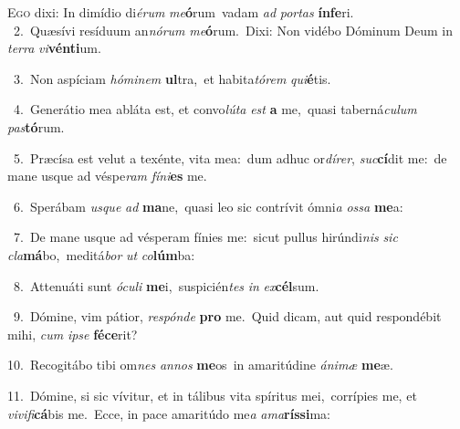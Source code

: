 \lettrine{\initial\textcolor{\initialcolor}{E}}{go} dixi: In dimídio di\-\textit{é}\-\textit{rum} \textit{me}\-\textbf{ó}rum~\star vadam \textit{ad} \textit{por}\-\textit{tas} \textbf{ín}\-\textbf{fe}ri.\\
{\numbfont\textcolor{\numbcolor}{~2.}}~Quæsívi resíduum an\-\textit{nó}\-\textit{rum} \textit{me}\-\textbf{ó}rum.~\star Dixi: Non vidébo Dóminum Deum in \textit{ter}\-\textit{ra} \textit{vi}\-\textbf{vén}\textbf{ti}um.\par
{\numbfont\textcolor{\numbcolor}{~3.}}~Non aspíciam \textit{hó}\-\textit{mi}\textit{nem} \textbf{ul}\-tra,~\star et habita\-\textit{tó}\-\textit{rem} \textit{qui}\-\textbf{é}tis.\par
{\numbfont\textcolor{\numbcolor}{~4.}}~Generátio mea abláta est, et convo\-\textit{lú}\-\textit{ta} \textit{est} \textbf{a} me,~\star quasi taberná\-\textit{cu}\-\textit{lum} \textit{pas}\-\textbf{tó}rum.\par
{\numbfont\textcolor{\numbcolor}{~5.}}~Præcísa est velut a texénte, vita mea:~\dagger dum adhuc or\-\textit{dí}\-\textit{rer}, \textit{suc}\-\textbf{cí}dit me:~\star de mane usque ad véspe\textit{ram} \textit{fí}\-\textit{ni}\textbf{es} me.\par
{\numbfont\textcolor{\numbcolor}{~6.}}~Sperábam \textit{us}\-\textit{que} \textit{ad} \textbf{ma}\-ne,~\star quasi leo sic contrívit ómni\textit{a} \textit{os}\-\textit{sa} \textbf{me}\-a:\par
{\numbfont\textcolor{\numbcolor}{~7.}}~De mane usque ad vésperam fínies me:~\dagger sicut pullus hirúndi\textit{nis} \textit{sic} \textit{cla}\-\textbf{má}bo,~\star meditá\textit{bor} \textit{ut} \textit{co}\-\textbf{lúm}ba:\par
{\numbfont\textcolor{\numbcolor}{~8.}}~Attenuáti sunt \textit{ó}\-\textit{cu}\textit{li} \textbf{me}\-i,~\star suspicién\textit{tes} \textit{in} \textit{ex}\-\textbf{cél}sum.\par
{\numbfont\textcolor{\numbcolor}{~9.}}~Dómine, vim pátior, \textit{re}\-\textit{spón}\textit{de} \textbf{pro} me.~\star Quid dicam, aut quid respondébit mihi, \textit{cum} \textit{ip}\-\textit{se} \textbf{fé}\-\textbf{ce}rit?\par
{\numbfont\textcolor{\numbcolor}{10.}}~Recogitábo tibi om\textit{nes} \textit{an}\-\textit{nos} \textbf{me}\-os~\star in amaritúdine \textit{á}\-\textit{ni}\textit{mæ} \textbf{me}\-æ.\par
{\numbfont\textcolor{\numbcolor}{11.}}~Dómine, si sic vívitur, et in tálibus vita spíritus mei,~\dagger corrípies me, et \textit{vi}\-\textit{vi}\textit{fi}\textbf{cá}bis me.~\star Ecce, in pace amaritúdo me\textit{a} \textit{a}\-\textit{ma}\textbf{rís}\textbf{si}ma:\par
